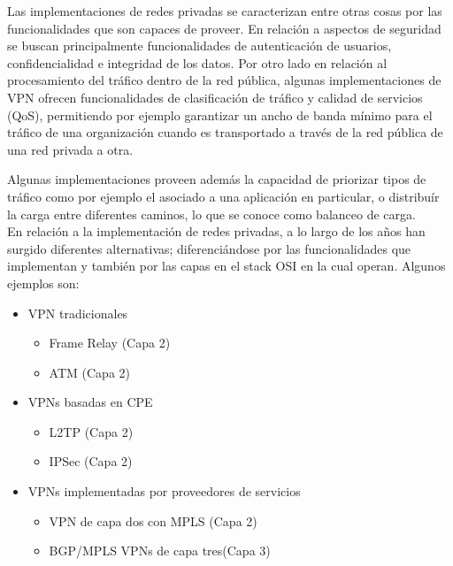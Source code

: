 Las implementaciones de redes privadas se caracterizan entre otras cosas por las funcionalidades que son capaces de proveer. En relaci\'on a aspectos de seguridad se buscan principalmente funcionalidades de autenticaci\'on de usuarios, confidencialidad e integridad de los datos. Por otro lado en relaci\'on al procesamiento del tr\'afico dentro de la red p\'ublica, algunas implementaciones de VPN ofrecen funcionalidades de clasificaci\'on de tr\'afico y calidad de servicios (QoS), permitiendo por ejemplo garantizar un ancho de banda m\'inimo para el tr\'afico de una organizaci\'on cuando es transportado a trav\'es de la red p\'ublica de una red privada a otra. 

Algunas implementaciones proveen adem\'as la capacidad de priorizar tipos de tr\'afico como por ejemplo el asociado a una aplicaci\'on en particular, o distribu\'ir la carga entre diferentes caminos, lo que se conoce como balanceo de carga.\\


En relaci\'on a la implementaci\'on de redes privadas, a lo largo de los años han surgido diferentes alternativas; diferenciándose por las funcionalidades que implementan y tambi\'en por las capas en el stack OSI en la cual operan. Algunos ejemplos son: 

\begin{itemize}
\item VPN tradicionales
	\begin{itemize}
	\item Frame Relay (Capa 2)	
	\item ATM (Capa 2)
	\end{itemize}
	
\item VPNs basadas en CPE
	\begin{itemize}
	\item L2TP (Capa 2)
	\item IPSec (Capa 2)
	\end{itemize}
	
\item VPNs implementadas por proveedores de servicios
	\begin{itemize}
	\item VPN de capa dos con MPLS (Capa 2)
	\item BGP/MPLS VPNs de capa tres(Capa 3)
	\end{itemize}
\end{itemize}

